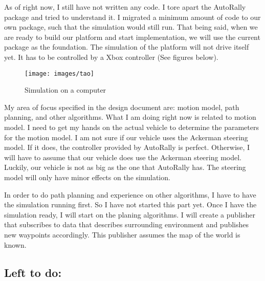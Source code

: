 \documentclass[compsoc,draftclsnofoot,onecolumn,10pt]{IEEEtran}
\begin{document}
As of right now, I still have not written any code. I tore apart the AutoRally package and tried to understand it. I migrated a minimum amount of code to our own package, such that the simulation would still run. That being said, when we are ready to build our platform and start implementation, we will use the current package as the foundation. The simulation of the platform will not drive itself yet. It has to be controlled by a Xbox controller (See figures below). \par 

\begin{figure}[H]
  \centering
  \texttt{[image: images/tao]}
  \caption{Simulation on a computer}
\end{figure}

My area of focus specified in the design document are: motion model, path planning, and other algorithms. What I am doing right now is related to motion model. I need to get my hands on the actual vehicle to determine the parameters for the motion model. I am not sure if our vehicle uses the Ackerman steering model. If it does, the controller provided by AutoRally is perfect. Otherwise, I will have to assume that our vehicle does use the Ackerman steering model. Luckily, our vehicle is not as big as the one that AutoRally has. The steering model will only have minor effects on the simulation. 

In order to do path planning and experience on other algorithms, I have to have the simulation running first. So I have not started this part yet. Once I have the simulation ready, I will start on the planing algorithms. I will create a publisher that subscribes to data that describes surrounding environment and publishes new waypoints accordingly. This publisher assumes the map of the world is known.

\subsection{Left to do:}
\end{document}
